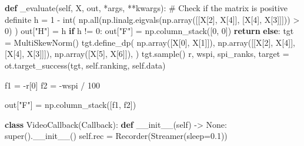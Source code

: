 \documentclass[
  authoryear,
  preprint,
  3p]{elsarticle}
\newenvironment{Shaded}{\begin{snugshade}}{\end{snugshade}}
\newcommand{\BuiltInTok}[1]{\textcolor[rgb]{0.00,0.23,0.31}{#1}}
\newcommand{\CommentTok}[1]{\textcolor[rgb]{0.37,0.37,0.37}{#1}}
\newcommand{\ControlFlowTok}[1]{\textcolor[rgb]{0.00,0.23,0.31}{\textbf{#1}}}
\newcommand{\DecValTok}[1]{\textcolor[rgb]{0.68,0.00,0.00}{#1}}
\newcommand{\FloatTok}[1]{\textcolor[rgb]{0.68,0.00,0.00}{#1}}
\newcommand{\FunctionTok}[1]{\textcolor[rgb]{0.28,0.35,0.67}{#1}}
\newcommand{\KeywordTok}[1]{\textcolor[rgb]{0.00,0.23,0.31}{\textbf{#1}}}
\newcommand{\NormalTok}[1]{\textcolor[rgb]{0.00,0.23,0.31}{#1}}
\newcommand{\OperatorTok}[1]{\textcolor[rgb]{0.37,0.37,0.37}{#1}}
\newcommand{\StringTok}[1]{\textcolor[rgb]{0.13,0.47,0.30}{#1}}
\newcommand{\VariableTok}[1]{\textcolor[rgb]{0.07,0.07,0.07}{#1}}
\begin{document}
\begin{Shaded}
\begin{Highlighting}[]
    \KeywordTok{def}\NormalTok{ \_evaluate(}\VariableTok{self}\NormalTok{, X, out, }\OperatorTok{*}\NormalTok{args, }\OperatorTok{**}\NormalTok{kwargs):}
        \CommentTok{\# Check if the matrix is positive definite}
\NormalTok{        h }\OperatorTok{=} \DecValTok{1} \OperatorTok{{-}} \BuiltInTok{int}\NormalTok{(}
\NormalTok{            np.}\BuiltInTok{all}\NormalTok{(np.linalg.eigvals(np.array([[X[}\DecValTok{2}\NormalTok{], X[}\DecValTok{4}\NormalTok{]], [X[}\DecValTok{4}\NormalTok{], X[}\DecValTok{3}\NormalTok{]]])) }\OperatorTok{\textgreater{}} \DecValTok{0}\NormalTok{)}
\NormalTok{        )}
\NormalTok{        out[}\StringTok{"H"}\NormalTok{] }\OperatorTok{=}\NormalTok{ h}
        \ControlFlowTok{if}\NormalTok{ h }\OperatorTok{!=} \DecValTok{0}\NormalTok{:}
\NormalTok{            out[}\StringTok{"F"}\NormalTok{] }\OperatorTok{=}\NormalTok{ np.column\_stack([}\DecValTok{0}\NormalTok{, }\DecValTok{0}\NormalTok{])}
            \ControlFlowTok{return}
        \ControlFlowTok{else}\NormalTok{:}
\NormalTok{            tgt }\OperatorTok{=}\NormalTok{ MultiSkewNorm()}
\NormalTok{            tgt.define\_dp(}
\NormalTok{                np.array([X[}\DecValTok{0}\NormalTok{], X[}\DecValTok{1}\NormalTok{]]),}
\NormalTok{                np.array([[X[}\DecValTok{2}\NormalTok{], X[}\DecValTok{4}\NormalTok{]], [X[}\DecValTok{4}\NormalTok{], X[}\DecValTok{3}\NormalTok{]]]),}
\NormalTok{                np.array([X[}\DecValTok{5}\NormalTok{], X[}\DecValTok{6}\NormalTok{]]),}
\NormalTok{            )}
\NormalTok{            tgt.sample()}
\NormalTok{            r, wspi, spi\_ranks, target }\OperatorTok{=}\NormalTok{ ot.target\_success(tgt, }\VariableTok{self}\NormalTok{.ranking, }\VariableTok{self}\NormalTok{.data)}

\NormalTok{            f1 }\OperatorTok{=} \OperatorTok{{-}}\NormalTok{r[}\DecValTok{0}\NormalTok{]}
\NormalTok{            f2 }\OperatorTok{=} \OperatorTok{{-}}\NormalTok{wspi }\OperatorTok{/} \DecValTok{100}

\NormalTok{            out[}\StringTok{"F"}\NormalTok{] }\OperatorTok{=}\NormalTok{ np.column\_stack([f1, f2])}


\KeywordTok{class}\NormalTok{ VideoCallback(Callback):}
    \KeywordTok{def} \FunctionTok{\_\_init\_\_}\NormalTok{(}\VariableTok{self}\NormalTok{) }\OperatorTok{{-}\textgreater{}} \VariableTok{None}\NormalTok{:}
        \BuiltInTok{super}\NormalTok{().}\FunctionTok{\_\_init\_\_}\NormalTok{()}
        \VariableTok{self}\NormalTok{.rec }\OperatorTok{=}\NormalTok{ Recorder(Streamer(sleep}\OperatorTok{=}\FloatTok{0.1}\NormalTok{))}


\end{Highlighting}
\end{Shaded}
\end{document}
